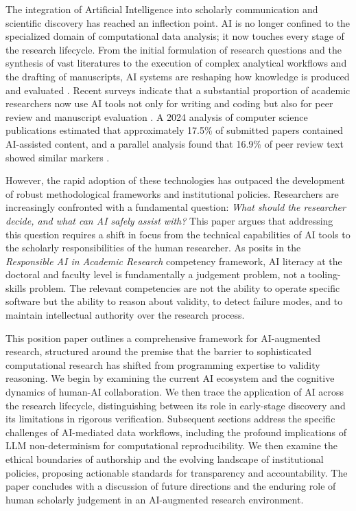 \documentclass[12pt, a4paper]{article}
\begin{document}
The integration of Artificial Intelligence into scholarly communication and scientific discovery has reached an inflection point. AI is no longer confined to the specialized domain of computational data analysis; it now touches every stage of the research lifecycle. From the initial formulation of research questions and the synthesis of vast literatures to the execution of complex analytical workflows and the drafting of manuscripts, AI systems are reshaping how knowledge is produced and evaluated \citep{zhang2025exploring, shi2026survey}. Recent surveys indicate that a substantial proportion of academic researchers now use AI tools not only for writing and coding but also for peer review and manuscript evaluation \citep{nature2025peerreview, hai2024llmresearch}. A 2024 analysis of computer science publications estimated that approximately 17.5\% of submitted papers contained AI-assisted content, and a parallel analysis found that 16.9\% of peer review text showed similar markers \citep{hai2024llmresearch}.

However, the rapid adoption of these technologies has outpaced the development of robust methodological frameworks and institutional policies. Researchers are increasingly confronted with a fundamental question: \textit{What should the researcher decide, and what can AI safely assist with?} This paper argues that addressing this question requires a shift in focus from the technical capabilities of AI tools to the scholarly responsibilities of the human researcher. As \citet{zyphur2026responsible} posits in the \textit{Responsible AI in Academic Research} competency framework, AI literacy at the doctoral and faculty level is fundamentally a judgement problem, not a tooling-skills problem. The relevant competencies are not the ability to operate specific software but the ability to reason about validity, to detect failure modes, and to maintain intellectual authority over the research process.

This position paper outlines a comprehensive framework for AI-augmented research, structured around the premise that the barrier to sophisticated computational research has shifted from programming expertise to validity reasoning. We begin by examining the current AI ecosystem and the cognitive dynamics of human-AI collaboration. We then trace the application of AI across the research lifecycle, distinguishing between its role in early-stage discovery and its limitations in rigorous verification. Subsequent sections address the specific challenges of AI-mediated data workflows, including the profound implications of LLM non-determinism for computational reproducibility. We then examine the ethical boundaries of authorship and the evolving landscape of institutional policies, proposing actionable standards for transparency and accountability. The paper concludes with a discussion of future directions and the enduring role of human scholarly judgement in an AI-augmented research environment.
\end{document}
